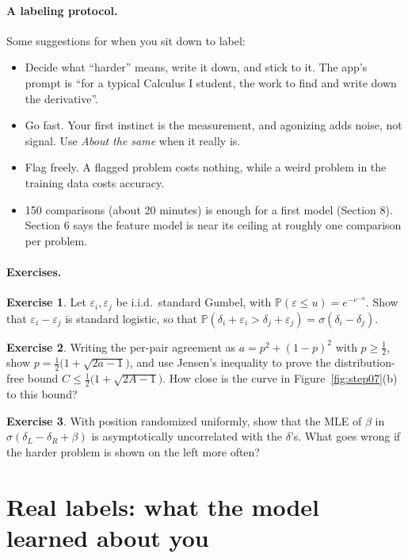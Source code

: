 \documentclass[11pt]{article}
\theoremstyle{definition}
\newtheorem{exercise}{Exercise}[section]
\theoremstyle{plain}
\theoremstyle{remark}
\renewcommand{\P}{\mathbb{P}}
\renewcommand{\_}{\oldunderscore\allowbreak}
\begin{document}
\paragraph{A labeling protocol.}
Some suggestions for when you sit down to label:
\begin{itemize}[nosep]
\item Decide what ``harder'' means, write it down, and stick to it. The app's prompt is ``for a typical Calculus I student, the work
  to find and write down the derivative''.
\item Go fast. Your first instinct is the measurement, and agonizing adds noise, not signal. Use \emph{About the same} when it really is.
\item Flag freely. A flagged problem costs nothing, while a weird problem in the training data costs accuracy.
\item 150 comparisons (about 20 minutes) is enough for a first model (Section 8). Section 6 says the feature model is
  near its ceiling at roughly one comparison per problem.
\end{itemize}

\paragraph{Exercises.}
\begin{exercise}\label{ex:gumbel}
Let $\varepsilon_i,\varepsilon_j$ be i.i.d.\ standard Gumbel, with $\P(\varepsilon\le u)=e^{-e^{-u}}$. Show that $\varepsilon_i-\varepsilon_j$ is standard logistic, so
that $\P(\delta_i+\varepsilon_i>\delta_j+\varepsilon_j)=\sigma(\delta_i-\delta_j)$.
\end{exercise}
\begin{exercise}
Writing the per-pair agreement as $a=p^2+(1-p)^2$ with $p\ge\frac12$, show $p=\frac12\bigl(1+\sqrt{2a-1}\bigr)$, and use Jensen's inequality
to prove the distribution-free bound $C\le\frac12\bigl(1+\sqrt{2A-1}\bigr)$. How close is the curve in Figure~\ref{fig:step07}(b) to this bound?
\end{exercise}
\begin{exercise}
With position randomized uniformly, show that the MLE of $\beta$ in $\sigma(\delta_L-\delta_R+\beta)$ is asymptotically uncorrelated with
the $\delta$'s. What goes wrong if the harder problem is shown on the left more often?
\end{exercise}

\section{Real labels: what the model learned about you}
\label{sec:real}
\end{document}

